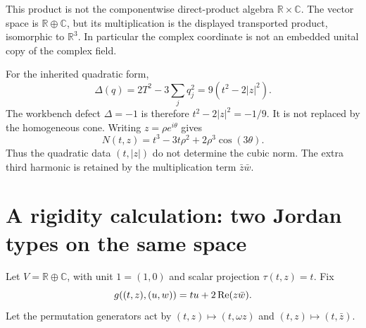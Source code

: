 \documentclass[11pt]{article}
\theoremstyle{definition}\newtheorem{definition}[theorem]{Definition}
\newcommand{\R}{\mathbb R}\newcommand{\Q}{\mathbb Q}\newcommand{\Z}{\mathbb Z}
\newcommand{\C}{\mathbb C}\newcommand{\OO}{\mathbb O}
\begin{document}
This product is not the componentwise direct-product algebra $\R\times\C$. The vector space is $\R\oplus\C$, but its multiplication is the displayed transported product, isomorphic to $\R^3$. In particular the complex coordinate is not an embedded unital copy of the complex field.

For the inherited quadratic form,
\begin{equation}\label{eq:koide}
 \Delta(q)=2T^2-3\sum_jq_j^2=9(t^2-2|z|^2).
\end{equation}
The workbench defect $\Delta=-1$ is therefore $t^2-2|z|^2=-1/9$. It is not replaced by the homogeneous cone. Writing $z=\rho e^{i\theta}$ gives
\begin{equation}
 N(t,z)=t^3-3t\rho^2+2\rho^3\cos(3\theta).
\end{equation}
Thus the quadratic data $(t,|z|)$ do not determine the cubic norm. The extra third harmonic is retained by the multiplication term $\bar z\bar w$.

\section{A rigidity calculation: two Jordan types on the same space}
Let $V=\R\oplus\C$, with unit $1=(1,0)$ and scalar projection $\tau(t,z)=t$. Fix
\[
 g((t,z),(u,w))=tu+2\operatorname{Re}(z\bar w).
\]
Let the permutation generators act by $(t,z)\mapsto(t,\omega z)$ and $(t,z)\mapsto(t,\bar z)$.
\end{document}
